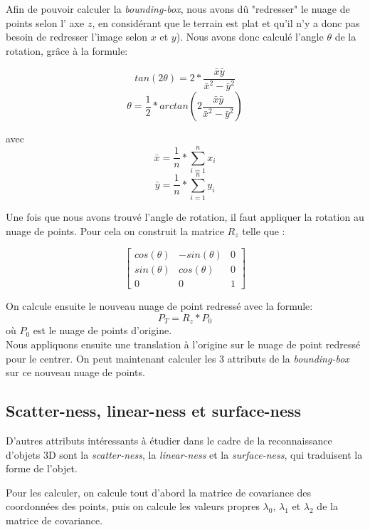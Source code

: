 		Afin de pouvoir calculer la \emph{bounding-box}, nous avons dû "redresser" le nuage de points selon l' axe $z$, en considérant que le terrain est plat et qu'il n'y a donc pas besoin de redresser l'image selon $x$ et $y$).
		Nous avons donc calculé l'angle $\theta$ de la rotation, grâce à la formule:

		\[ tan(2 \theta) = 2 * \frac{\bar{x}\bar{y}}{\bar{x}^2 - \bar{y}^2} \]
		\[ \theta = \frac{1}{2} * arctan(2 \frac{\bar{x}\bar{y}}{\bar{x}^2 - \bar{y}^2}) \]

		avec \[ \bar{x} = \frac{1}{n} * \sum_{i =1}^n{x_i} \]
		\[ \bar{y} = \frac{1}{n} * \sum_{i =1}^n{y_i} \]

		Une fois que nous avons trouvé l'angle de rotation, il faut appliquer la rotation au nuage de points. Pour cela on construit la matrice $R_z$ telle que :

		\[\begin{bmatrix}
		   cos(\theta) & -sin(\theta) & 0 \\
		sin(\theta) & cos(\theta) & 0 \\
		0 & 0 & 1
		\end{bmatrix}\]

		On calcule ensuite le nouveau nuage de point redressé avec la formule:
		\[ P_T = R_z * P_0\]
		où $P_0$ est le nuage de points d'origine. \\

		Nous appliquons ensuite une translation à l'origine sur le nuage de point redressé pour le centrer. On peut maintenant calculer les 3 attributs de la \emph{bounding-box} sur ce nouveau nuage de points.


	\subsection{Scatter-ness, linear-ness et surface-ness}
		D'autres attributs intéressants à étudier dans le cadre de la reconnaissance d'objets 3D sont la \emph{scatter-ness}, la \emph{linear-ness} et la \emph{surface-ness}, qui traduisent la forme de l'objet.

		Pour les calculer, on calcule tout d'abord la matrice de covariance des coordonnées des points, puis on calcule les valeurs propres $\lambda_0$, $\lambda_1$ et $\lambda_2$ de la matrice de covariance. \\

